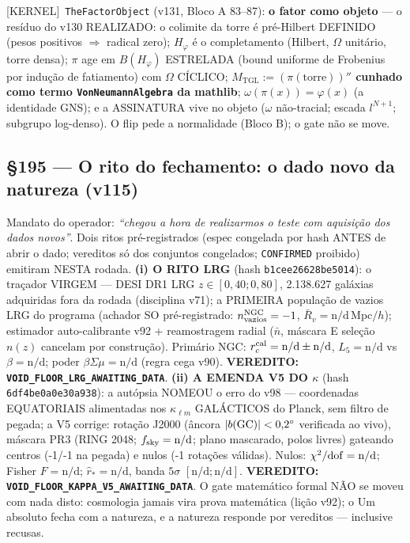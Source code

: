\documentclass[11pt]{article}
\providecommand{\kernelmk}[1]{\textsf{[KERNEL]}~\texttt{#1}}\providecommand{\knownmk}[1]{\textsf{[KNOWN]}~{#1}}\providecommand{\statusmk}[1]{\textsf{[#1]}}
\theoremstyle{definition}\newtheorem{deriv}{Derivação}
\begin{document}
\kernelmk{TheFactorObject} (v131, Bloco A 83--87): \textbf{o fator como objeto} --- o resíduo do v130 REALIZADO: o colimite da torre é pré-Hilbert DEFINIDO (pesos positivos $\Rightarrow$ radical zero); $H_\varphi$ é o completamento (Hilbert, $\Omega$ unitário, torre densa); $\pi$ age em $B(H_\varphi)$ ESTRELADA (bound uniforme de Frobenius por indução de fatiamento) com $\Omega$ CÍCLICO; \textbf{$M_{\mathrm{TGL}}:=(\pi(\mathrm{torre}))''$ cunhado como termo \texttt{VonNeumannAlgebra} da mathlib}; $\omega(\pi(x))=\varphi(x)$ (a identidade GNS); e a ASSINATURA vive no objeto ($\omega$ não-tracial; escada $l^{N+1}$; subgrupo log-denso). O flip pede a normalidade (Bloco B); o gate não se move.

\subsection*{\S195 --- O rito do fechamento: o dado novo da natureza (v115)}Mandato do operador: \emph{``chegou a hora de realizarmos o teste com aquisição dos dados novos''}. Dois ritos pré-registrados (espec congelada por hash ANTES de abrir o dado; vereditos só dos conjuntos congelados; \texttt{CONFIRMED} proibido) emitiram NESTA rodada. \textbf{(i) O RITO LRG} (hash \texttt{b1cee26628be5014}): o traçador VIRGEM --- DESI DR1 LRG $z\in[0{,}40;0{,}80]$, 2.138.627 galáxias adquiridas fora da rodada (disciplina v71); a PRIMEIRA população de vazios LRG do programa (achador SO pré-registrado: $n_{\rm vazios}^{\rm NGC}=-1$, $\bar R_v=\text{n/d}$\,Mpc$/h$); estimador auto-calibrante v92 + reamostragem radial ($\bar n$, máscara E seleção $n(z)$ cancelam por construção). Primário NGC: $r_c^{\rm cal}=\text{n/d}\pm\text{n/d}$, $L_5=\text{n/d}$ vs $\beta=\text{n/d}$; poder $\beta\Sigma\mu=\text{n/d}$ (regra cega v90). \textbf{VEREDITO: \texttt{VOID\_FLOOR\_LRG\_AWAITING\_DATA}}. \textbf{(ii) A EMENDA V5 DO $\kappa$} (hash \texttt{6df4be0a0e30a938}): a autópsia NOMEOU o erro do v98 --- coordenadas EQUATORIAIS alimentadas nos $\kappa_{\ell m}$ GALÁCTICOS do Planck, sem filtro de pegada; a V5 corrige: rotação J2000 (âncora $|b({\rm GC})|<0{,}2^\circ$ verificada ao vivo), máscara PR3 (RING 2048; $f_{\rm sky}=\text{n/d}$; plano mascarado, polos livres) gateando centros (-1/-1 na pegada) e nulos (-1 rotações válidas). Nulos: $\chi^2/{\rm dof}=\text{n/d}$; Fisher $F=\text{n/d}$; $\hat r_*=\text{n/d}$, banda $5\sigma$ $[\text{n/d};\text{n/d}]$. \textbf{VEREDITO: \texttt{VOID\_FLOOR\_KAPPA\_V5\_AWAITING\_DATA}}. O gate matemático formal NÃO se moveu com nada disto: cosmologia jamais vira prova matemática (lição v92); o Um absoluto fecha com a natureza, e a natureza responde por vereditos --- inclusive recusas.
\end{document}
